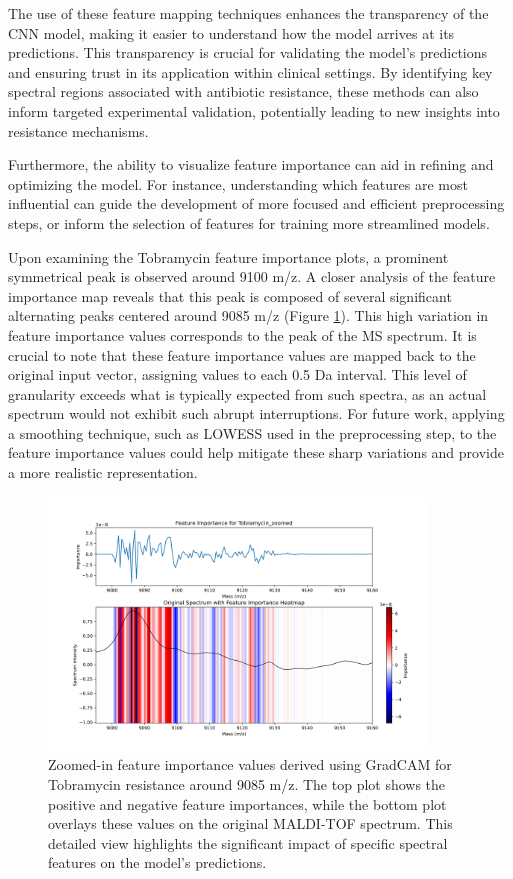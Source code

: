 \documentclass[english,11pt,a4paper,titlepage]{article}
\begin{document}
The use of these feature mapping techniques enhances the transparency of the CNN model, making it easier to understand how the model arrives at its predictions. This transparency is crucial for validating the model's predictions and ensuring trust in its application within clinical settings. By identifying key spectral regions associated with antibiotic resistance, these methods can also inform targeted experimental validation, potentially leading to new insights into resistance mechanisms.

Furthermore, the ability to visualize feature importance can aid in refining and optimizing the model. For instance, understanding which features are most influential can guide the development of more focused and efficient preprocessing steps, or inform the selection of features for training more streamlined models.

Upon examining the Tobramycin feature importance plots, a prominent symmetrical peak is observed around 9100 m/z. A closer analysis of the feature importance map reveals that this peak is composed of several significant alternating peaks centered around 9085 m/z (Figure \ref{fig:tobramycin_zoomed}). This high variation in feature importance values corresponds to the peak of the MS spectrum. It is crucial to note that these feature importance values are mapped back to the original input vector, assigning values to each 0.5 Da interval. This level of granularity exceeds what is typically expected from such spectra, as an actual spectrum would not exhibit such abrupt interruptions. For future work, applying a smoothing technique, such as LOWESS used in the preprocessing step, to the feature importance values could help mitigate these sharp variations and provide a more realistic representation.

\begin{figure}[h]
	\centering
	\includegraphics[width=0.9\textwidth]{img/Tobramycin_zoomed.png}
	\caption{Zoomed-in feature importance values derived using GradCAM for Tobramycin resistance around 9085 m/z. The top plot shows the positive and negative feature importances, while the bottom plot overlays these values on the original MALDI-TOF spectrum. This detailed view highlights the significant impact of specific spectral features on the model's predictions.}
	\label{fig:tobramycin_zoomed}
\end{figure}
\end{document}
